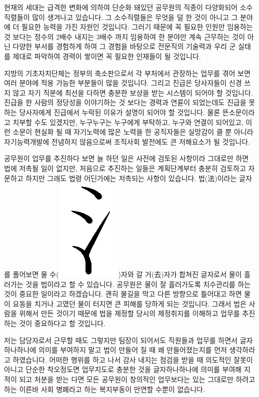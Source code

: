 \documentclass[chapter,book,openany,twoside]{oblivoir}
\begin{document}
현재의 세대는 급격한 변화에 의하여 단순화 돼있던 공무원의 직종이 다양화되어 소수직렬들이 많이 생겨나고 있습니다. 그 소수직렬들은 무엇을 덜 한 것이 아니고 그 분야에 더 필요한 능력을 가진 자원인 것입니다. 그러기 때문에 꼭 필요한 인원만 임용하는 것 보다는 정수의 2배수 내지는 3배수 까지 임용하여 한 분야만 계속 근무하는 것이 아닌 다양한 부서를 경험하게 하여 그 경험을 바탕으로 전문직의 기술력과 우리 군 실태를 제대로 파악하여 경력이 쌓이면 꼭 필요한 인재들이 될 것입니다.

지방의 기초자치단체는 정부의 축소판으로서 각 부처에서 관장하는 업무를 겪어 보면 여러 분야에 적용 가능한 부분들이 많을 것입니다. 그리고 진급은 당사자들이 신경 쓰지 않고 자기 직분에 최선을 다하면 충분한 보상을 받는 시스템이 되어야 할 것입니다. 진급을 한 사람의 정당성을 이야기하는 것 보다는 경력과 연륜이 되었는데도 진급을 못하는 당사자에게 진급에서 누락된 이유가 설명이 되어야 할 것입니다. 물론 뜬소문이라고 치부할 수도 있겠지만, 누구누구는 누구에게 부탁하고, 누구와 연결이 되어있고, 이런 소문이 현실화 될 때 자기노력에 많은 노력을 한 공직자들은 실망감이 클 뿐 아니라 자기능력개발에 전념하지 않음으로써 조직사회 발전에도 큰 저해요소가 될 것입니다.

공무원이 업무를 추진하다 보면 늘 하던 일은 사전에 검토된 사항이라 그대로만 하면 법에 저촉될 일이 없지만, 처음으로 추진하는 일들은 계획단계부터 충분히 검토하고 자문하고 하지만 그래도 법령 어딘가에는 저촉되는 사항이 있습니다. 법(法)이라는 글자를 풀어보면 물 수(\includegraphics[scale=0.045]{DBs/pic/011})자와 갈 거(去)자가 합쳐진 글자로서 물이 흘러가는 것을 법이라고 할 수 있습니다. 공무원은 물이 잘 흘러가도록 치수관리를 하는 것이 중요한 일이라고 하겠습니다. 괜히 물길을 막고 다른 방향으로 틀어대고 하면 물이 요동을 치거나 고였던 물이 터지면 큰 피해를 당하게 되는 것입니다. 그래서 법은 사람을 위해서 만든 것이기 때문에 법을 제정할 당시의 제정취지를 이해하고 업무를 추진하는 것이 중요하다고 할 것입니다.

저는 담당자로서 근무할 때도 그렇지만 팀장이 되어서도 직원들과 업무를 하면서 글자 하나하나에 의미를 부여하지 말고 법이 만들어 질 때 왜 만들어졌는지를 먼저 생각하라고 하였습니다. 어떠한 행위를 하고 나서 감사 내지는 점검을 받을 때 의도적인 잘못이 아니고 단순한 착오정도면 업무지도로 충분한 것을 글자하나하나에 의미를 부여해 지적이 되고 처분을 받는 다면 모든 공무원이 창의적인 업무보다는 있는 그대로만 하려고 하는 이른바 사회 병폐라고 하는 복지부동이 만연할 수뿐이 없습니다.
\end{document}
